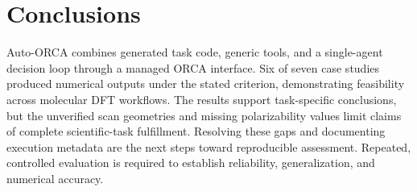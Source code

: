\documentclass[a4paper,11pt]{article}
\begin{document}
\section{Conclusions}
Auto-ORCA combines generated task code, generic tools, and a single-agent decision loop through a managed ORCA interface.
Six of seven case studies produced numerical outputs under the stated criterion, demonstrating feasibility across molecular DFT workflows.
The results support task-specific conclusions, but the unverified scan geometries and missing polarizability values limit claims of complete scientific-task fulfillment.
Resolving these gaps and documenting execution metadata are the next steps toward reproducible assessment.
Repeated, controlled evaluation is required to establish reliability, generalization, and numerical accuracy.
\medskip
\renewcommand{\refname}{References}
\begingroup
\footnotesize
\linespread{1.05}\selectfont
{}
\end{document}
